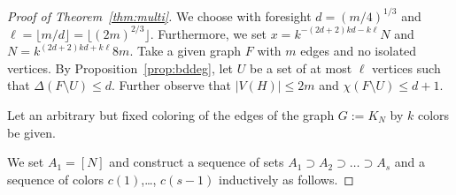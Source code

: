 \documentclass[reqno]{amsart}
\theoremstyle{remark}
\begin{document}
\begin{proof}[Proof of Theorem~\ref{thm:multi}]
We choose with foresight $d=(m/4)^{1/3}$ and $\ell=\lfloor m/d\rfloor=\lfloor (2m)^{2/3}\rfloor$.  
Furthermore, we set $x = k^{-(2d+2)kd -k\ell}N$ and $N= k^{(2d+2)kd + k\ell} 8m$. 
Take a given graph  $F$ with $m$ edges and no isolated vertices.  
By Proposition~\ref{prop:bddeg}, let $U$ be a set of at most $\ell$ vertices such that $\Delta(F\setminus U)\le d$. Further observe that 
$|V(H)|\le 2m$ and $\chi(F\setminus U)\le d+1$. 

Let  an arbitrary but fixed coloring of the edges of the graph  $G:=K_N$ by $k$ colors be given. 

We set $A_1=[N]$ and construct a sequence of sets $A_1\supset A_2\supset \ldots\supset A_s$ and a sequence of colors $c(1)$,\ldots, $c(s-1)$ inductively as follows.
 


\end{proof}
\end{document}
